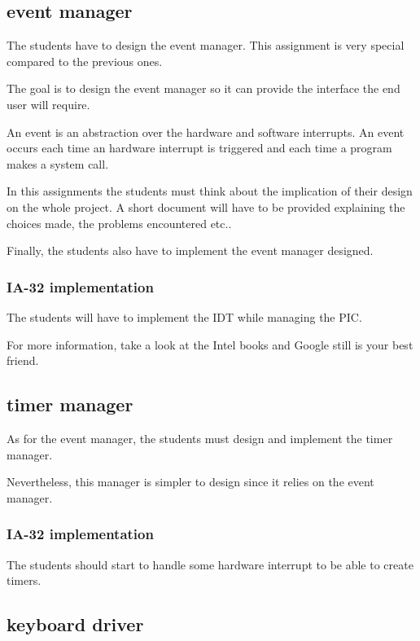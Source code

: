\subsection{event manager}

The students have to design the event manager. This assignment is very
special compared to the previous ones.

The goal is to design the event manager so it can provide the
interface the end user will require.

An event is an abstraction over the hardware and software interrupts.
An event occurs each time an hardware interrupt is triggered and each
time a program makes a system call.

In this assignments the students must think about the implication of
their design on the whole project. A short document will have to be
provided explaining the choices made, the problems encountered etc..

Finally, the students also have to implement the event manager designed.

\subsubsection{IA-32 implementation}

The students will have to implement the IDT while managing the PIC.

For more information, take a look at the Intel books and Google still
is your best friend.

\subsection{timer manager}

As for the event manager, the students must design and implement the timer
manager.

Nevertheless, this manager is simpler to design since it relies on the
event manager.

\subsubsection{IA-32 implementation}

The students should start to handle some hardware interrupt to be able
to create timers.

\subsection{keyboard driver}

